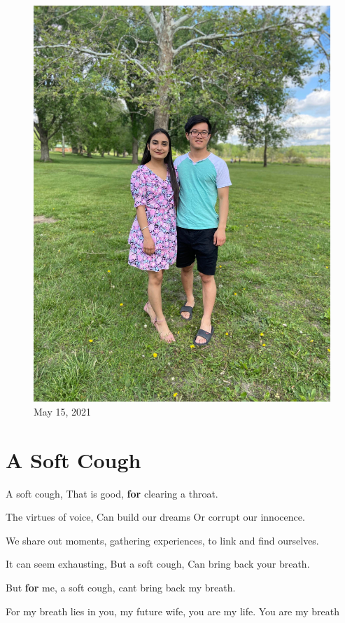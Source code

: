 \documentclass[
]{book}
\newenvironment{Shaded}{\begin{snugshade}}{\end{snugshade}}
\newcommand{\ControlFlowTok}[1]{\textcolor[rgb]{0.13,0.29,0.53}{\textbf{#1}}}
\newcommand{\NormalTok}[1]{#1}
\newcommand{\StringTok}[1]{\textcolor[rgb]{0.31,0.60,0.02}{#1}}
\begin{document}
\begin{figure}
\centering
\includegraphics[width=5.20833in,height=\textheight]{mimages/9 5-15-2021.jpg}
\caption{May 15, 2021}
\end{figure}

\hypertarget{a-soft-cough}{%
\chapter{A Soft Cough}\label{a-soft-cough}}

\begin{Shaded}
\begin{Highlighting}[]
\NormalTok{A soft cough,}
\NormalTok{That is good,}
\ControlFlowTok{for}\NormalTok{ clearing a throat.}

\NormalTok{The virtues of voice,}
\NormalTok{Can build our dreams}
\NormalTok{Or corrupt our innocence.  }

\NormalTok{We share out moments,}
\NormalTok{gathering experiences,}
\NormalTok{to link and find ourselves. }

\NormalTok{It can seem exhausting,}
\NormalTok{But a soft cough,}
\NormalTok{Can bring back your breath.}

\NormalTok{But }\ControlFlowTok{for}\NormalTok{ me,}
\NormalTok{a soft cough,}
\NormalTok{can}\StringTok{\textquotesingle{}t bring back my breath.}

\StringTok{For my breath lies in you,}
\StringTok{my future wife, }
\StringTok{you are my life.}
\StringTok{You are my breath   }
\end{Highlighting}
\end{Shaded}
\end{document}
